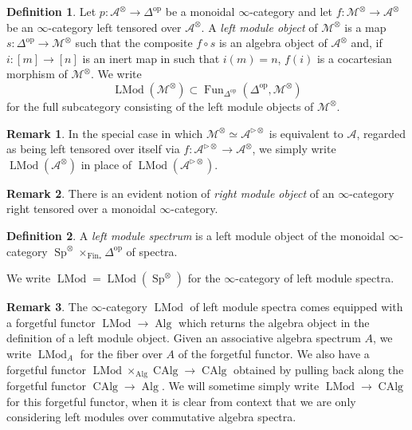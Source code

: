 \documentclass[12pt]{article}
\theoremstyle{definition}
\newtheorem{definition}{Definition}[subsection]
\newtheorem{remark}{Remark}[subsection]
\newcommand{\A}{\mathcal{A}}
\newcommand{\M}{\mathcal{M}}
\renewcommand{\i}{\infty}
\newcommand{\op}{\mathrm{op}}
\DeclareMathOperator{\LMod}{LMod}
\DeclareMathOperator{\Alg}{Alg}
\DeclareMathOperator{\CAlg}{CAlg}
\DeclareMathOperator{\Fin}{Fin}
\DeclareMathOperator{\Fun}{Fun}
\DeclareMathOperator{\Sp}{Sp}
\begin{document}
\begin{definition}
Let $p:\A^\otimes\to\Delta^{\op}$ be a monoidal $\i$-category and let $f:\M^\otimes\to\A^\otimes$ be an $\i$-category left tensored over $\A^\otimes$. A {\em left module object} of $\M^\otimes$ is a map $s:\Delta^{\op}\to\M^\otimes$ such that the composite $f\circ s$ is an algebra object of $\A^\otimes$ and, if $i : [m]\to [n]$ is an inert map in such that $i(m) = n$, $f(i)$ is a cocartesian morphism of $\M^\otimes$.
We write
\[
\LMod(\M^\otimes)\subset\Fun_{\Delta^{\op}}(\Delta^{\op},\M^\otimes)
\]
for the full subcategory consisting of the left module objects of $\M^\otimes$.
\end{definition}
\begin{remark}
In the special case in which $\M^\otimes\simeq\A^{\triangleright\otimes}$ is equivalent to $\A$, regarded as being left tensored over itself via $f:\A^{\triangleright\otimes}\to\A^\otimes$, we simply write $\LMod(\A^\otimes)$ in place of $\LMod(\A^{\triangleright\otimes})$.
\end{remark}
\begin{remark}
There is an evident notion of {\em right module object} of an $\infty$-category right tensored over a monoidal $\i$-category.
\end{remark}

\begin{definition}
A {\em left module spectrum} is a left module object of the monoidal $\i$-category $\Sp^\otimes\times_{\Fin_*}\Delta^{\op}$ of spectra.
\end{definition}

We write $\LMod=\LMod(\Sp^\otimes)$ for the $\i$-category of left module spectra.

\begin{remark}
The $\i$-category $\LMod$ of left module spectra comes equipped with a forgetful functor $\LMod\to\Alg$ which returns the algebra object in the definition of a left module object.
Given an associative algebra spectrum $A$, we write $\LMod_A$ for the fiber over $A$ of the forgetful functor.
We also have a forgetful functor $\LMod\times_{\Alg}\CAlg\to\CAlg$ obtained by pulling back along the forgetful functor $\CAlg\to\Alg$.
We will sometime simply write $\LMod\to\CAlg$ for this forgetful functor, when it is clear from context that we are only considering left modules over commutative algebra spectra.
\end{remark}
\end{document}

